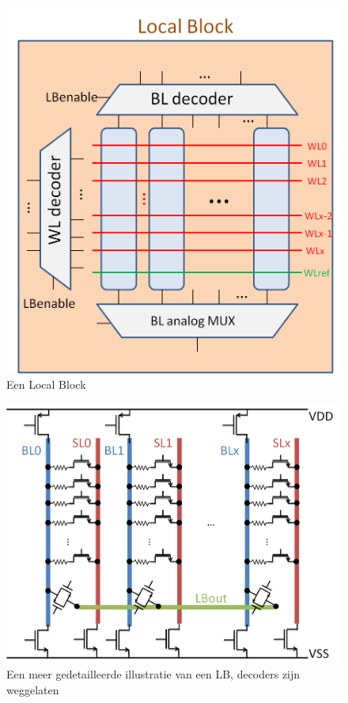 \begin{figure}
  \centering
  \includegraphics[scale=0.3]{../fig/hfdstk-architecture-localblock.png}
  \caption{Een Local Block}
  \label{fig:LB}
\end{figure}

\begin{figure}
  \centering
  \includegraphics[scale=0.3]{../fig/hfdstk-architecture-LB-details.png}
  \caption{Een meer gedetailleerde illustratie van een LB, decoders zijn weggelaten}
  \label{fig:LB-details}
\end{figure}

